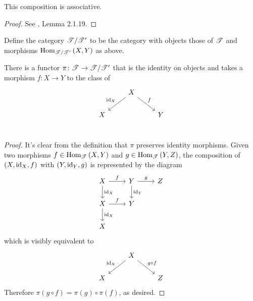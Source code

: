\documentclass[dissertation.tex]{subfiles}
\begin{document}
\begin{lem}
  This composition is associative.
  \begin{proof}
    See \cite{NeemanTCats}, Lemma 2.1.19.
  \end{proof}
\end{lem}

\begin{defn}
  Define the category $\mathscr{T}/\mathscr{T}^\prime$ to be the category with objects those of $\mathscr{T}$ and morphisms $\operatorname{Hom}_{\mathscr{T}/\mathscr{T}^\prime}\left(X,Y\right)$ as above.
\end{defn}

\begin{lem}
  There is a functor $\pi \colon \mathscr{T} \to \mathscr{T}/\mathscr{T}^\prime$ that is the identity on objects and takes a morphism $f \colon X \to Y$ to the class of
  $$\begin{tikzcd}
    & X \arrow{rd}{f}\arrow[swap]{ld}{\id_X}\\
    X & & Y\\
  \end{tikzcd}$$
  
  \begin{proof}
    It's clear from the definition that $\pi$ preserves identity morphisms.
    Given two morphisms $f \in \operatorname{Hom}_{\mathscr{T}}\left(X,Y\right)$ and $g \in \operatorname{Hom}_{\mathscr{T}}\left(Y,Z\right)$, the composition of $(X,\operatorname{id}_X,f)$ with $(Y,\operatorname{id}_Y,g)$ is represented by the diagram
    $$\begin{tikzcd}
      X \arrow{r}{f}\arrow{d}{\id_X} & Y \arrow{d}{\id_Y}\arrow{r}{g} & Z\\
      X \arrow{r}{f}\arrow{d}{\id_X} & Y\\
      X
    \end{tikzcd}$$
    which is visibly equivalent to 
    $$\begin{tikzcd}
      & X \arrow[swap]{ld}{\id_X}\arrow{rd}{g \circ f}\\
      X & & Z
    \end{tikzcd}$$
    Therefore $\pi(g \circ f) = \pi(g) \circ \pi(f)$, as desired.
  \end{proof}
\end{lem}
\end{document}
